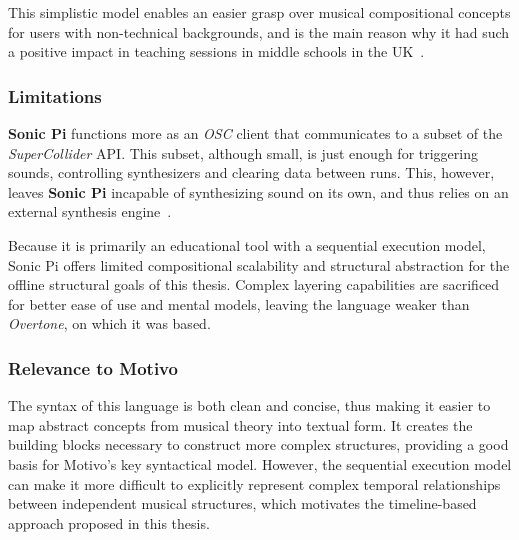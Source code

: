 This simplistic model enables an easier grasp over musical compositional concepts for users with non-technical
backgrounds, and is the main reason why it had such a positive impact in teaching sessions in middle schools in the
UK~\cite{Aaron_2016, Aaron_Blackwell_2013}.


\subsubsection{Limitations}

\textbf{Sonic Pi} functions more as an \textit{OSC} client that communicates to a subset of the \textit{SuperCollider}
API\@.
This subset, although small, is just enough for triggering sounds, controlling synthesizers and clearing data between
runs.
This, however, leaves \textbf{Sonic Pi} incapable of synthesizing sound on its own, and thus relies on an external
synthesis engine~\cite{Aaron_Blackwell_2013}.

Because it is primarily an educational tool with a sequential execution model, Sonic Pi offers limited compositional
scalability and structural abstraction for the offline structural goals of this thesis.
Complex layering capabilities are sacrificed for better ease of use and mental models, leaving the language weaker than
\textit{Overtone}, on which it was based.


\subsubsection{Relevance to Motivo}

The syntax of this language is both clean and concise, thus making it easier to map abstract concepts from musical
theory into textual form.
It creates the building blocks necessary to construct more complex structures, providing a good basis for Motivo's key
syntactical model.
However, the sequential execution model can make it more difficult to explicitly represent complex temporal
relationships between independent musical structures, which motivates the timeline-based approach proposed in this
thesis.


